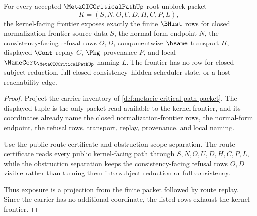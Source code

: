 \begin{theorem}
\label{thm:metacic-critical-path-kernel-frontier-exposure}
For every accepted $\MetaCICCriticalPathUp$ root-unblock packet
$$
K=(S,N,O,U,D,H,C,P,L),
$$
the kernel-facing frontier exposes exactly the finite $\BHist$ rows for closed normalization-frontier source data $S$, the normal-form endpoint $N$, the consistency-facing refusal rows $O,D$, componentwise $\hsame$ transport $H$, displayed $\Cont$ replay $C$, $\Pkg$ provenance $P$, and local $\NameCert_{\MetaCICCriticalPathUp}$ naming $L$. The frontier has no row for closed subject reduction, full closed consistency, hidden scheduler state, or a host reachability edge.
\end{theorem}
\begin{proof}
Project the carrier inventory of \autoref{def:metacic-critical-path-packet}. The displayed tuple is the only packet read available to the kernel frontier, and its coordinates already name the closed normalization-frontier rows, the normal-form endpoint, the refusal rows, transport, replay, provenance, and local naming.

Use the public route certificate and obstruction scope separation. The route certificate reads every public kernel-facing path through $S,N,O,U,D,H,C,P,L$, while the obstruction separation keeps the consistency-facing refusal rows $O,D$ visible rather than turning them into subject reduction or full consistency.

Thus exposure is a projection from the finite packet followed by route replay. Since the carrier has no additional coordinate, the listed rows exhaust the kernel frontier.
\end{proof}

